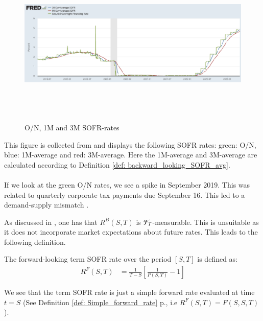 \begin{figure}[htp]
    \centering
    \includegraphics[height = 8cm, width=16cm]{figures/SOFR/ON_1M_3M_SOFR.PNG}
    \caption{O/N, 1M and 3M SOFR-rates}
    \label{fig: ON_1M_3M_SOFR}
\end{figure}

This figure is collected from \cite{FredSOFR} 
and displays the following SOFR rates:
green: O/N, blue: 1M-average and red: 3M-average. Here the 1M-average and 3M-average are calculated according to Definition \ref{def: backward_looking_SOFR_avg}. 
\\~\\
If we look at the green O/N rates, we see a spike in September 2019.  This was related to quarterly corporate tax payments due September 16. This led to a demand-supply mismatch  \cite{FederalReserve2019}.

\newpage 
As discussed in \cite{Skov_2020}, one has that $R^{B}(S,T)$ is $\mathcal{F}_{T}$-measurable. This is unsuitable as it does not incorporate market expectations about future rates. This leads to the following definition. 

\begin{definition}
The forward-looking term SOFR rate over the period $[S,T]$ is defined as: 
\begin{align*}
R^{F}(S,T) &= \frac{1}{T-S}\left[
\frac{1}{P(S,T)} -1
\right]    
\end{align*}
\end{definition}

We see that the term SOFR rate is just a simple forward rate evaluated at time $t=S$ (See Definition \ref{def: Simple_forward_rate} p.\pageref{def: Simple_forward_rate}, i.e $R^{F}(S,T) = F(S,S,T)$). 

